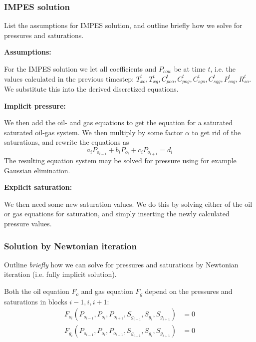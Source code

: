 
\subsubsection{IMPES solution} %
\label{ssub:impes_solution}
\begin{question}
  List the assumptions for IMPES solution, and outline briefly how we solve for pressures and saturations.
\end{question}

\textbf{Assumptions:}

For the IMPES solution we let all coefficients and $P_{cow}$ be at time $t$, i.e. the values calculated in the previous timestep: $T_{xo}^t, T_{xg}^t, C_{poo}^t, C_{pog}^t, C_{sgo}^t, C_{sgg}^t, P_{cog}^t, R_{so}^t$. We substitute this into the derived discretized equations.

\noindent\textbf{Implicit pressure:}

We then add the oil- and gas equations to get the equation for a saturated saturated oil-gas system. We then multiply by some factor $\alpha$ to get rid of the saturations, and rewrite the equations as
\begin{equation}
  a_i P_{o_{i-1}} + b_i P_{o_i} + c_i P_{o_{i+1}} = d_i
\end{equation}
The resulting equation system may be solved for pressure using for example Gaussian elimination.

\noindent\textbf{Explicit saturation:}

We then need some new saturation values. We do this by solving either of the oil or gas equations for saturation, and simply inserting the newly calculated pressure values.


\subsubsection{Solution by Newtonian iteration} %
\label{ssub:solution_by_newtonian_iteration}
\begin{question}
  Outline \emph{briefly} how we can solve for pressures and saturations by Newtonian iteration (i.e. fully implicit solution).
\end{question}

Both the oil equation $F_o$ and gas equation $F_g$ depend on the pressures and saturations in blocks $i-1,i,i+1$:
\begin{align}
    F_{o_i} \left( P_{o_{i-1}}, P_{o_i}, P_{o_{i+1}}, S_{g_{i-1}}, S_{g_i}, S_{g_{i+1}} \right) & = 0 \\
    F_{g_i} \left( P_{o_{i-1}}, P_{o_i}, P_{o_{i+1}}, S_{g_{i-1}}, S_{g_i}, S_{g_{i+1}} \right) & = 0
\end{align}


